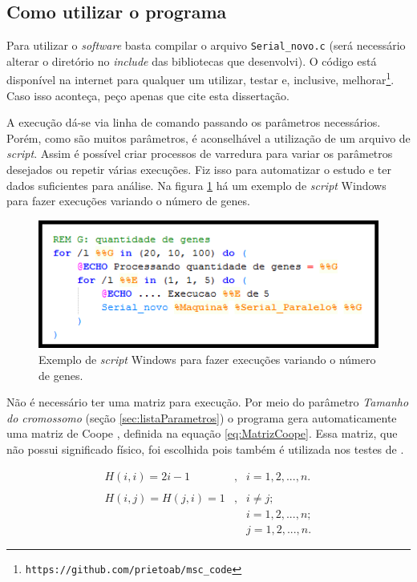 \subsection{Como utilizar o programa}
	
	Para utilizar o \emph{software} basta compilar o arquivo \texttt{Serial\_novo.c} (será necessário alterar o diretório no \emph{include} das bibliotecas que desenvolvi). O código está disponível na internet para qualquer um utilizar, testar e, inclusive, melhorar\footnote{\texttt{https://github.com/prietoab/msc\_code}}. Caso isso aconteça, peço apenas que cite esta dissertação.
	
		A execução dá-se via linha de comando passando os parâmetros necessários. Porém, como são muitos parâmetros, é aconselhável a utilização de um arquivo de \emph{script}. Assim é possível criar processos de varredura para variar os parâmetros desejados ou repetir várias execuções. Fiz isso para automatizar o estudo e ter dados suficientes para análise. Na figura \ref{fig:script_windows} há um exemplo de \emph{script} Windows para fazer execuções variando o número de genes.
			
		\begin{figure}[htbp]
			\centering
				\includegraphics{figs/materiais_metodo/software/script_windows.png}
			\caption{Exemplo de \emph{script} Windows para fazer execuções variando o número de genes.}
			\label{fig:script_windows}
		\end{figure}

	Não é necessário ter uma matriz para execução. Por meio do parâmetro \emph{Tamanho do cromossomo} (seção \ref{sec:listaParametros}) o programa gera automaticamente uma matriz de Coope \cite{Coope1977}, definida na equação \ref{eq:MatrizCoope}. Essa matriz, que não possui significado físico, foi escolhida pois também é utilizada nos testes de \cite{metodo2011}.
	
	\begin{equation}\label{eq:MatrizCoope}
		\begin{array}{ccl}
			H(i,i) = 2i - 1 			& , & i = 1, 2, ..., n. \\
														&		&		\\
			H(i,j) = H(j,i) = 1		& , & i \neq j; \\
														&		& i = 1, 2, ..., n; \\
														&		& j = 1, 2, ..., n.
		\end{array}
	\end{equation}
	
